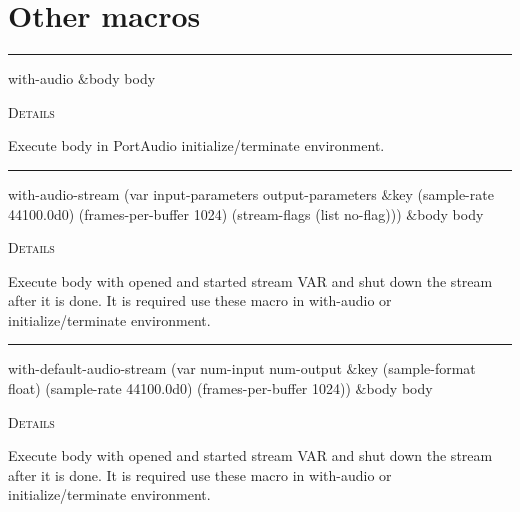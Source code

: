 \documentclass[a4paper]{report}
\begin{document}
  
      \section{Other macros}
      

    \rule{\linewidth}{0.1mm}
    
    \label{portaudio__fun__with-audio}
    \begin{defun}[Macro]
    with-audio $\&$body body


	
    \bigskip
    \textsc{Details}

Execute body in PortAudio initialize/terminate environment.


    
    \end{defun}
  
  

    \rule{\linewidth}{0.1mm}
    
    \label{portaudio__fun__with-audio-stream}
    \begin{defun}[Macro]
    with-audio-stream (var input-parameters output-parameters $\&$key (sample-rate 44100.0d0)
 (frames-per-buffer 1024) (stream-flags (list no-flag))) $\&$body body


	
    \bigskip
    \textsc{Details}

Execute body with opened and started stream VAR and shut down   the stream after it is done. It is required use these macro in with-audio or initialize/terminate environment.


    
    \end{defun}
  
  

    \rule{\linewidth}{0.1mm}
    
    \label{portaudio__fun__with-default-audio-stream}
    \begin{defun}[Macro]
    with-default-audio-stream (var num-input num-output $\&$key (sample-format float) (sample-rate 44100.0d0)
 (frames-per-buffer 1024)) $\&$body body


	
    \bigskip
    \textsc{Details}

Execute body with opened and started stream VAR and shut down   the stream after it is done. It is required use these macro in with-audio or initialize/terminate environment.


    
    \end{defun}
  
\end{document}
